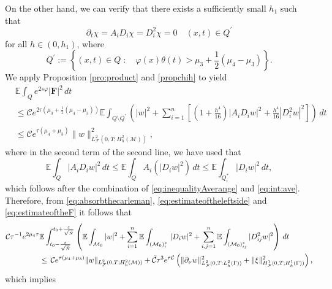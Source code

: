 \documentclass[11pt,oneside,leqno]{amsart}
\numberwithin{equation}{section}
\numberwithin{equation}{section}
\newcommand{\E}{\mathbb{E}}
\begin{document}
On the other hand, we can verify that there exists a sufficiently small $h_1$ such that
\begin{equation}\label{propchih}
\partial_{t}\chi=A_iD_i\chi=D_i^{2}\chi=0\quad (x,t)\in Q^{'}
\end{equation}
for all $h\in (0,h_1)$, where
\begin{equation*}
    Q^{'}:=\left\{(x,t)\in Q\;:\quad \varphi(x)\theta(t)>\mu_3+\frac{1}{2}(\mu_4-\mu_3)\right\}.
\end{equation*}
We apply Proposition \ref{pro:product} and \eqref{propchih} to yield 
\begin{equation}\label{eq:estimateoftheF}
    \begin{split}
&\E\int_{Q}e^{2s\varphi}|\mathbf{F}|^2\,dt\\
&\leq \mathcal{C}e^{2\tau\left(\mu_3+\frac{1}{2}(\mu_4-\mu_3)\right)}\E\int_{Q\setminus Q^{'}}\left(|w|^2+\sum_{i=1}^{n}\left[\left(1+\frac{h^4}{16}\right)|A_iD_iw|^2+\frac{h^4}{16}|D_i^2w|^2\right]\right)\,dt\\
&\leq \mathcal{C}e^{\tau (\mu_4+\mu_3)}\|w\|^2_{L_{\mathcal{F}}^2(0,T;H_h^2(\mathcal{M}))},
\end{split}
\end{equation}
where in the second term of the second line, we have used that
\begin{equation*}
    \E\int_{Q}|A_iD_iw|^2\,dt\leq \E\int_{Q}A_i(|D_iw|^2)\,dt\leq \E\int_{Q_i^{\ast}}|D_iw|^2\,dt,
\end{equation*}
which follows after the combination of \eqref{eq:inequalityAverange} and \eqref{eq:int:ave}. Therefore, from \eqref{eq:absorbthecarleman}, \eqref{eq:estimateoftheleftside} and \eqref{eq:estimateoftheF} it follows that
\begin{equation*}
\begin{split}
     \mathcal{C}\tau^{-1}e^{2\mu_4 \tau}&\E\int_{t_0-\frac{\varepsilon}{\sqrt{\Tilde{N}}}}^{t_0+\frac{\varepsilon}{\sqrt{\Tilde{N}}}}\left(\E\int_{\mathcal{M}_0}|w|^{2}+\sum_{i=1}^{n}\E\int_{(\mathcal{M}_{0})_{i}^{\ast}}\,|D_{i}w|^{2}+\sum_{i,j=1}^{n}\E\int_{(\mathcal{M}_0)^{\ast}_{ij}}|D^2_{ij} w|^2\right)\,dt\\
     &\leq\, \mathcal{C}e^{\tau (\mu_4+\mu_3)}\|w\|_{L_{\mathcal{F}}^2(0,T;H_h^2(\mathcal{M}))}+\Tilde{\mathcal{C}}\tau^3e^{\tau\mathcal{C}}\left(\|{ \partial_{\nu}w}\|^2_{L^2_\mathcal{F}(0,T:L_h^2(\Gamma))}+\|\xi\|^2_{H^1_{\mathcal{F}}(0,T;H_h^1(\Gamma))}\right),
\end{split}
\end{equation*}
which implies 
\end{document}
